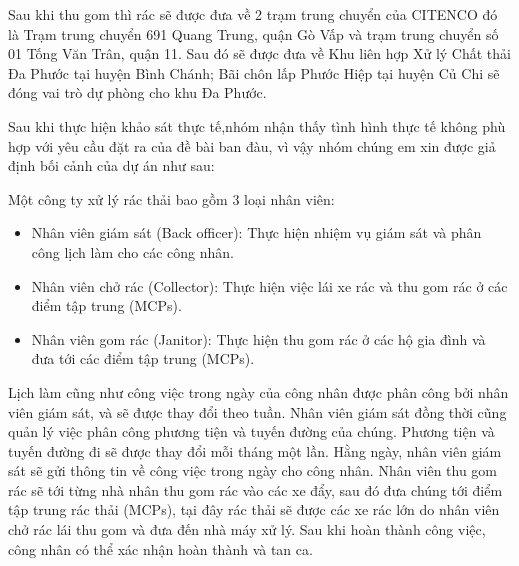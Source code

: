         \quad Sau khi thu gom thì rác sẽ được đưa về 2 trạm trung chuyển của CITENCO đó là Trạm trung chuyển 691 Quang Trung, quận Gò Vấp và trạm trung chuyển số 01 Tống Văn Trân, quận 11. Sau đó sẽ được đưa về Khu liên hợp Xử lý Chất thải Đa Phước tại huyện Bình Chánh; Bãi chôn lấp Phước Hiệp tại huyện Củ Chi sẽ đóng vai trò dự phòng cho khu Đa Phước.

        \quad Sau khi thực hiện khảo sát thực tế,nhóm nhận thấy tình hình thực tế không phù hợp với yêu cầu đặt ra của đề bài ban đàu, vì vậy nhóm chúng em xin được giả định bối cảnh của dự án như sau:

        \quad Một công ty xử lý rác thải bao gồm 3 loại nhân viên:
        \begin{itemize}
            \item Nhân viên giám sát (Back officer): Thực hiện nhiệm vụ giám sát và phân công lịch làm cho các công nhân.
            \item Nhân viên chở rác (Collector): Thực hiện việc lái xe rác và thu gom rác ở các điểm tập trung (MCPs).
            \item Nhân viên gom rác (Janitor): Thực hiện thu gom rác ở các hộ gia đình và đưa tới các điểm tập trung (MCPs).
        \end{itemize}

      \quad Lịch làm cũng như công việc trong ngày của công nhân được phân công bởi nhân viên giám sát, và sẽ được thay đổi theo tuần. Nhân viên giám sát đồng thời cũng quản lý việc phân công phương tiện và tuyến đường của chúng. Phương tiện và tuyến đường đi sẽ được thay đổi mỗi tháng một lần. Hằng ngày, nhân viên giám sát sẽ gửi thông tin về công việc trong ngày cho công nhân. Nhân viên thu gom rác sẽ tới từng nhà nhân thu gom rác vào các xe đẩy, sau đó đưa chúng tới điểm tập trung rác thải (MCPs), tại đây rác thải sẽ được các xe rác lớn do nhân viên chở rác lái thu gom và đưa đến nhà máy xử lý. Sau khi hoàn thành công việc, công nhân có thể xác nhận hoàn thành và tan ca.
